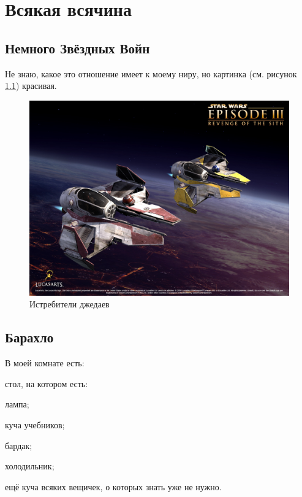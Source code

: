 \chapter{Всякая всячина}
\section{Немного Звёздных Войн}

Не знаю, какое это отношение имеет к моему ниру, но картинка (см. рисунок \ref{pic:ships}) красивая.

\begin{figure}[h!]
	\centering \includegraphics[width=1\linewidth]{Ships.jpg}
	\caption{Истребители джедаев}\label{pic:ships}
\end{figure}

\section {Барахло}
В моей комнате есть:
\begin{twoenumerate}
	\item стол, на котором есть:
	\begin{twoenumerate}
		\item лампа;
		\item куча учебников;
		\item бардак;
	\end{twoenumerate}
	\item холодильник;
	\item ещё куча всяких вещичек, о которых знать уже не нужно.
\end{twoenumerate}